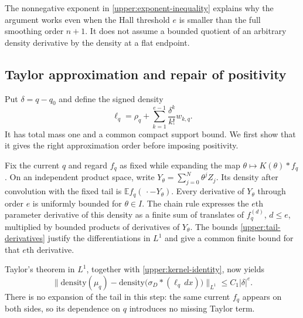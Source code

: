 \documentclass[11pt,letterpaper]{article}
\theoremstyle{definition}
\theoremstyle{remark}
\newcommand{\E}{\mathbb E}
\begin{document}
The nonnegative exponent in \eqref{upper:exponent-inequality} explains why
the argument works even when the Hall threshold $e$ is smaller than
the full smoothing order $n+1$.  It does not assume a bounded quotient of
an arbitrary density derivative by the density at a flat endpoint.

\subsection{Taylor approximation and repair of positivity}

Put $\delta=q-q_0$ and define the signed density
\begin{equation}\label{upper:signed-density}
 \ell_q=\rho_q+
       \sum_{k=1}^{e-1}\frac{\delta^k}{k!}w_{k,q}.
\end{equation}
It has total mass one and a common compact support bound.  We first show
that it gives the right approximation order before imposing positivity.

Fix the current $q$ and regard $f_q$ as fixed while expanding the map
$\theta\mapsto K(\theta)*f_q$.  On an independent product space, write
$Y_\theta=\sum_{j=0}^{N}\theta^jZ_j$.  Its density after convolution with
the fixed tail is $\E f_q(\,\cdot-Y_\theta)$.  Every derivative of
$Y_\theta$ through order $e$ is uniformly bounded for $\theta\in I$.
The chain rule expresses the $e$th parameter derivative of this density
as a finite sum of translates of $f_q^{(d)}$, $d\le e$, multiplied by
bounded products of derivatives of $Y_\theta$.  The bounds
\eqref{upper:tail-derivatives} justify the differentiations in $L^1$ and
give a common finite bound for that $e$th derivative.

Taylor's theorem in $L^1$, together with
\eqref{upper:kernel-identity}, now yields
\begin{equation}\label{upper:taylor}
 \bigl\|\mathrm{density}(\mu_q)
       -\mathrm{density}\bigl(\sigma_D*(\ell_q\,dx)\bigr)
 \bigr\|_{L^1}\le C_1|\delta|^e.
\end{equation}
There is no expansion of the tail in this step: the same current $f_q$
appears on both sides, so its dependence on $q$ introduces no missing
Taylor term.
\end{document}
